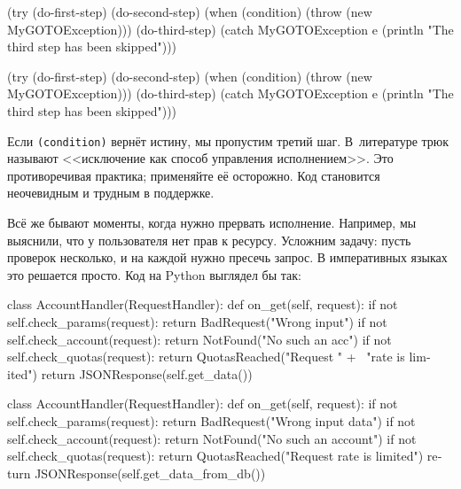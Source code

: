 \ifx\DEVICETYPE\MOBILE

\begin{english}
  \begin{clojure}
(try
  (do-first-step)
  (do-second-step)
  (when (condition)
    (throw (new MyGOTOException)))
  (do-third-step)
  (catch MyGOTOException e
    (println "The third step
                  has been skipped")))
  \end{clojure}
\end{english}

\else

\begin{english}
  \begin{clojure}
(try
  (do-first-step)
  (do-second-step)
  (when (condition)
    (throw (new MyGOTOException)))
  (do-third-step)
  (catch MyGOTOException e
    (println "The third step has been skipped")))
  \end{clojure}
\end{english}

\fi

Если \verb|(condition)| вернёт истину, мы пропустим третий шаг. В~литературе
трюк называют <<исключение как способ управления исполнением>>. Это
противоречивая практика; применяйте её осторожно. Код становится неочевидным и
трудным в поддержке.


Всё же бывают моменты, когда нужно прервать исполнение. Например, мы
выяснили, что у пользователя нет прав к ресурсу. Усложним задачу: пусть проверок
несколько, и на каждой нужно пресечь запрос. В императивных языках это решается
просто. Код на Python выглядел бы так:


\ifx\DEVICETYPE\MOBILE

\begin{english}
  \begin{python}
class AccountHandler(RequestHandler):
  def on_get(self, request):
    if not self.check_params(request):
      return BadRequest("Wrong input")
    if not self.check_account(request):
      return NotFound("No such an acc")
    if not self.check_quotas(request):
      return QuotasReached("Request " + \
             "rate is limited")
    return JSONResponse(self.get_data())
  \end{python}
\end{english}

\else

\begin{english}
  \begin{python}
class AccountHandler(RequestHandler):
  def on_get(self, request):
    if not self.check_params(request):
      return BadRequest("Wrong input data")
    if not self.check_account(request):
      return NotFound("No such an account")
    if not self.check_quotas(request):
      return QuotasReached("Request rate is limited")
    return JSONResponse(self.get_data_from_db())
  \end{python}
\end{english}

